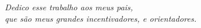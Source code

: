 \begin{dedicatoria}
   \vspace*{\fill}
   \centering
   \noindent
   \textit{ Dedico esse trabalho aos meus pais,\\
   que são meus grandes incentivadores, e orientadores.} \vspace*{\fill}
\end{dedicatoria}
